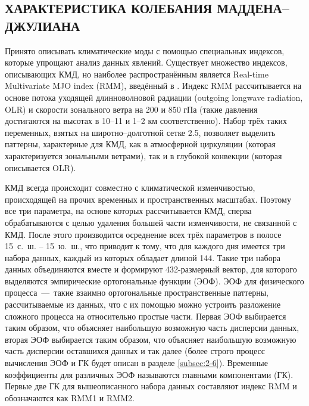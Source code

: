 \subsection{ХАРАКТЕРИСТИКА КОЛЕБАНИЯ МАДДЕНА--ДЖУЛИАНА}
\label{sec:rmm}

Принято описывать климатические моды с помощью специальных индексов, которые упрощают анализ данных явлений. Существует множество индексов, описывающих КМД, но наиболее распространённым является Real-time Multivariate MJO index (RMM), введённый в \cite{Wheeler_Hendon_2004}. Индекс RMM рассчитывается на основе потока уходящей длинноволновой радиации (outgoing longwave radiation, OLR) и скорости зонального ветра на 200 и 850 гПа (такие давления достигаются на высотах в 10--11 и 1--2 км соответственно). Набор трёх таких переменных, взятых на широтно--долготной сетке 2.5\textdegree{}\textdegree, позволяет выделить паттерны, характерные для КМД, как в атмосферной циркуляции (которая характеризуется зональными ветрами), так и в глубокой конвекции (которая описывается OLR).

КМД всегда происходит совместно с климатической изменчивостью, происходящей на прочих временных и пространственных масштабах. Поэтому все три параметра, на основе которых рассчитывается КМД, сперва обрабатываются с целью удаления большей части изменчивости, не связанной с КМД. После этого производится осреднение всех трёх параметров в полосе 15\textdegree~с.~ш. -- 15\textdegree~ю.~ш., что приводит к тому, что для каждого дня имеется три набора данных, каждый из которых обладает длиной 144. Такие три набора данных объединяются вместе и формируют 432-размерный вектор, для которого выделяются эмпирические ортогональные функции (ЭОФ). ЭОФ для физического процесса~---~такие взаимно ортогональные пространственные паттерны, рассчитываемые из данных, что с их помощью можно устроить разложение сложного процесса на относительно простые части. Первая ЭОФ выбирается таким образом, что объясняет наибольшую возможную часть дисперсии данных, вторая ЭОФ выбирается таким образом, что объясняет наибольшую возможную часть дисперсии оставшихся данных и так далее \cite[Гл. 6]{Zhang_et_al_2020} (более строго процесс вычисления ЭОФ и ГК будет описан в разделе \ref{subsec:2-6}). Временные коэффициенты для различных ЭОФ называются главными компонентами (ГК). Первые две ГК для вышеописанного набора данных составляют индекс RMM и обозначаются как RMM1 и RMM2.

